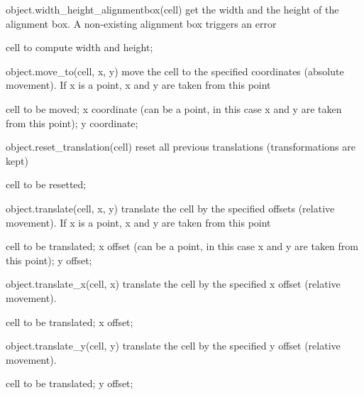 \begin{APIfunc}{object.width\_height\_alignmentbox(cell)}
    get the width and the height of the alignment box. A non-existing alignment box triggers an error
    \begin{APIparameters}
            cell to compute width and height;
    \end{APIparameters}
\end{APIfunc}
\begin{APIfunc}{object.move\_to(cell, x, y)}
    move the cell to the specified coordinates (absolute movement). If x is a point, x and y are taken from this point
    \begin{APIparameters}
            cell to be moved;
            x coordinate (can be a point, in this case x and y are taken from this point);
            y coordinate;
    \end{APIparameters}
\end{APIfunc}
\begin{APIfunc}{object.reset\_translation(cell)}
    reset all previous translations (transformations are kept)
    \begin{APIparameters}
            cell to be resetted;
    \end{APIparameters}
\end{APIfunc}
\begin{APIfunc}{object.translate(cell, x, y)}
    translate the cell by the specified offsets (relative movement). If x is a point, x and y are taken from this point
    \begin{APIparameters}
            cell to be translated;
            x offset (can be a point, in this case x and y are taken from this point);
            y offset;
    \end{APIparameters}
\end{APIfunc}
\begin{APIfunc}{object.translate\_x(cell, x)}
    translate the cell by the specified x offset (relative movement).
    \begin{APIparameters}
            cell to be translated;
            x offset;
    \end{APIparameters}
\end{APIfunc}
\begin{APIfunc}{object.translate\_y(cell, y)}
    translate the cell by the specified y offset (relative movement).
    \begin{APIparameters}
            cell to be translated;
            y offset;
    \end{APIparameters}
\end{APIfunc}
